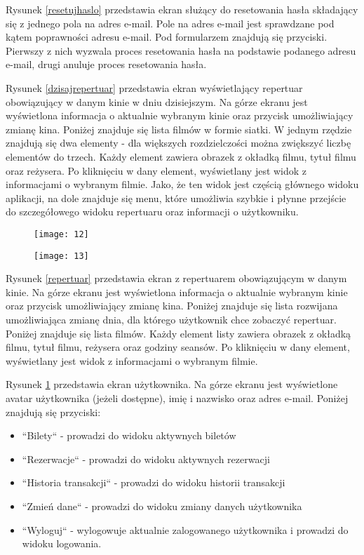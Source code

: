 Rysunek \ref{resetujhaslo} przedstawia ekran służący do resetowania hasła składający się z jednego pola na adres e-mail. Pole na adres e-mail jest sprawdzane pod kątem poprawności adresu e-mail. Pod formularzem znajdują się przyciski. Pierwszy z nich wyzwala proces resetowania hasła na podstawie podanego adresu e-mail, drugi anuluje proces resetowania hasła.

Rysunek \ref{dzisajrepertuar} przedstawia ekran wyświetlający repertuar obowiązujący w danym kinie w dniu dzisiejszym. Na górze ekranu jest wyświetlona informacja o aktualnie wybranym kinie oraz przycisk umożliwiający zmianę kina. Poniżej znajduje się lista filmów w formie siatki. W jednym rzędzie znajdują się dwa elementy - dla większych rozdzielczości można zwiększyć liczbę elementów do trzech. Każdy element zawiera obrazek z okładką filmu, tytuł filmu oraz reżysera. Po kliknięciu w dany element, wyświetlany jest widok z informacjami o wybranym filmie. Jako, że ten widok jest częścią głównego widoku aplikacji, na dole znajduje się menu, które umożliwia szybkie i płynne przejście do szczegółowego widoku repertuaru oraz informacji o użytkowniku. 
\newpage
\begin{figure}[h]
\centering
\begin{minipage}{.5\textwidth}
  \centering
  \texttt{[image: 12]}
  \label{repertuar}
\end{minipage}%
\begin{minipage}{.5\textwidth}
  \centering
  \texttt{[image: 13]}
  \label{uzytkownik}
\end{minipage}
\end{figure}

Rysunek \ref{repertuar} przedstawia ekran z repertuarem obowiązującym w danym kinie. Na górze ekranu jest wyświetlona informacja o aktualnie wybranym kinie oraz przycisk umożliwiający zmianę kina. Poniżej znajduje się lista rozwijana umożliwiająca zmianę dnia, dla którego użytkownik chce zobaczyć repertuar. Poniżej znajduje się lista filmów. Każdy element listy zawiera obrazek z okładką filmu, tytuł filmu, reżysera oraz godziny seansów. Po kliknięciu w dany element, wyświetlany jest widok z informacjami o wybranym filmie.

Rysunek \ref{uzytkownik} przedstawia ekran użytkownika. Na górze ekranu jest wyświetlone avatar użytkownika (jeżeli dostępne), imię i nazwisko oraz adres e-mail. Poniżej znajdują się przyciski:
\begin{itemize}
\item ``Bilety`` - prowadzi do widoku aktywnych biletów
\item ``Rezerwacje`` - prowadzi do widoku aktywnych rezerwacji
\item ``Historia transakcji`` - prowadzi do widoku historii transakcji
\item ``Zmień dane`` - prowadzi do widoku zmiany danych użytkownika
\item ``Wyloguj`` - wylogowuje aktualnie zalogowanego użytkownika i prowadzi do widoku logowania.
\end{itemize}


